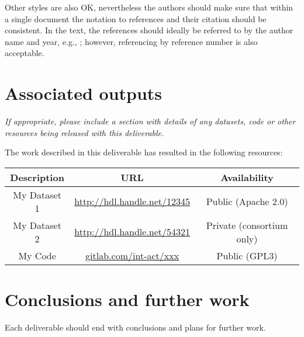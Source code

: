 \documentclass[10pt]{report}
\begin{document}
Other styles are also OK, nevertheless the authors should make sure
that within a single document the notation to references and their
citation should be consistent. In the text, the references should
ideally be referred to by the author name and year, e.g.,
\cite{bib:lamport1994latex}; however, referencing by reference number
is also acceptable.


\section{Associated outputs}

\textit{If appropriate, please include a section with details of any
  datasets, code or other resources being released with this deliverable.}

The work described in this deliverable has resulted in the following resources:

\begin{tabular}{|c|c|c|}
\hline
\rowcolor{INT-ACTorange}
\color{white} Description & 
\color{white} URL & 
\color{white} Availability 
\\\hline

\rowcolor{INT-ACTlightgray}\color{INT-ACTfont} 
My Dataset 1 &  
\url{http://hdl.handle.net/12345} &
Public (Apache 2.0) \\

\rowcolor{INT-ACTlightergray}\color{INT-ACTfont} 
My Dataset 2 &  
\url{http://hdl.handle.net/54321} &
Private (consortium only) \\

\rowcolor{INT-ACTlightgray}\color{INT-ACTfont} 
My Code &  
\url{gitlab.com/int-act/xxx} &
Public (GPL3) \\

\hline
\end{tabular}

\section{Conclusions and further work}

Each deliverable should end with conclusions and plans for further work.






\end{document}
